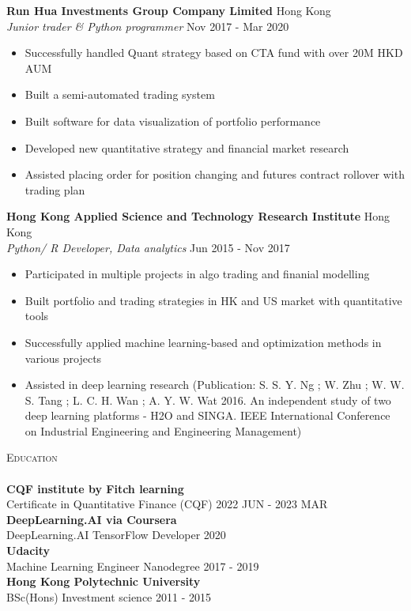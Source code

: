 \documentclass[a4paper]{article}
\newcommand{\lineunder} {
    \vspace*{-8pt} \\
    \hspace*{-18pt} \hrulefill \\
}
\newcommand{\header} [1] {
    {\hspace*{-18pt}\vspace*{6pt} \textsc{#1}}
    \vspace*{-6pt} \lineunder
}
\begin{document}
\textbf{Run Hua Investments Group Company Limited} \hfill Hong Kong\\
\textit{Junior trader \& Python programmer} \hfill Nov 2017 - Mar 2020\\
\vspace{-1mm}
\begin{itemize} \itemsep 1pt
    \item Successfully handled Quant strategy based on CTA fund with over 20M HKD AUM
    \item Built a semi-automated trading system
    \item Built software for data visualization of portfolio performance
    \item Developed new quantitative strategy and financial market research
        \item Assisted placing order for position changing and futures contract rollover with trading plan
\end{itemize}
\textbf{Hong Kong Applied Science and Technology Research Institute} \hfill Hong Kong\\
\textit{Python/ R Developer, Data analytics} \hfill Jun 2015 - Nov 2017\\
\vspace{-1mm}
\begin{itemize} \itemsep 1pt
    \item Participated in multiple projects in algo trading and finanial modelling
    \item Built portfolio and trading strategies in HK and US market with quantitative tools
    \item Successfully applied machine learning-based and optimization methods in various projects
    \item Assisted in deep learning research (Publication: S. S. Y. Ng ; W. Zhu ; W. W. S. Tang ; L. C. H. Wan ; A. Y. W. Wat 2016. An independent study of two deep learning platforms - H2O and SINGA. IEEE International Conference on Industrial Engineering and Engineering Management)
\end{itemize}

\header{Education}
\textbf{CQF institute by Fitch learning}\\
Certificate in Quantitative Finance (CQF) \hfill 2022 JUN - 2023 MAR\\
\vspace{2mm}
\textbf{DeepLearning.AI via Coursera}\\
DeepLearning.AI TensorFlow Developer \hfill 2020\\
\vspace{2mm}
\textbf{Udacity}\\
Machine Learning Engineer Nanodegree \hfill 2017 - 2019\\
\vspace{2mm}
\textbf{Hong Kong Polytechnic University}\\
BSc(Hons) Investment science \hfill 2011 - 2015\\
\vspace{2mm}
\end{document}

